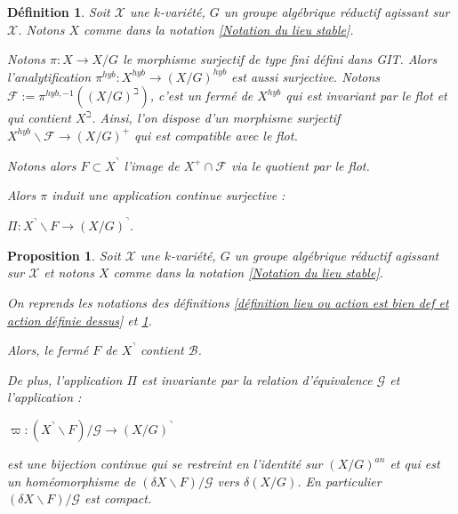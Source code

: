 \documentclass[11pt]{article}
\newtheorem{prop}[thm]{Proposition}
\newtheorem{defi}[thm]{Définition}
\newtheorem{rem}[thm]{Remarque}
\begin{document}
\begin{defi}\label{defi morphisme entre compactification du quotient et quotient compactification}
Soit $\mathcal{X}$ une $k$-variété, $G$ un groupe algébrique réductif agissant sur $\mathcal{X}$. Notons $X$ comme dans la notation \ref{Notation du lieu stable}. 

Notons $\pi : X \rightarrow X/G$ le morphisme surjectif de type fini défini dans GIT. Alors l'analytification $\pi^{hyb} : X^{hyb} \rightarrow (X/G)^{hyb}$ est aussi surjective. Notons $\mathcal{F} := \pi^{hyb, -1}((X/G)^\beth)$, c'est un fermé de $X^{hyb}$ qui est invariant par le flot et qui contient $X^\beth$. Ainsi, l'on dispose d'un morphisme surjectif $X^{hyb} \backslash \mathcal{F} \rightarrow (X/G)^+$ qui est compatible avec le flot. 

Notons alors $F \subset X^\urcorner$ l'image de $X^+ \cap \mathcal{F}$ via le quotient par le flot.

Alors $\pi$ induit une application continue surjective :
\begin{center}
$\Pi : X^\urcorner \backslash F \rightarrow (X/G)^\urcorner$.
\end{center}
\end{defi}


\begin{prop}\label{homéo entre compactification du quotient et quotient compactification}
Soit $\mathcal{X}$ une $k$-variété, $G$ un groupe algébrique réductif agissant sur $\mathcal{X}$ et notons $X$ comme dans la notation \ref{Notation du lieu stable}. 

On reprends les notations des définitions \ref{définition lieu ou action est bien def et action définie dessus} et \ref{defi morphisme entre compactification du quotient et quotient compactification}.

Alors, le fermé $F$ de $X^\urcorner$ contient $\mathcal{B}$.

De plus, l'application $\Pi$ est invariante par la relation d'équivalence $\mathcal{G}$ et l'application :
\begin{center}
$\varpi : (X^\urcorner \backslash F)/\mathcal{G} \rightarrow (X/G)^\urcorner$
\end{center}
est une bijection continue qui se restreint en l'identité sur $(X/G)^{an}$ et qui est un homéomorphisme de $(\delta X\backslash F)/\mathcal{G}$ vers $\delta (X/G)$. En particulier $(\delta X\backslash F)/\mathcal{G}$ est compact. 
\end{prop}

%
\end{document}
